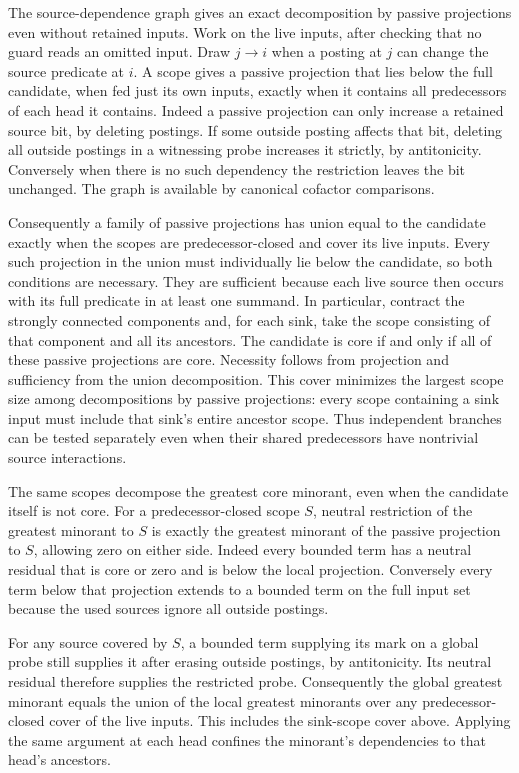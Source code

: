 The source-dependence graph gives an exact decomposition by
passive projections even without retained inputs. Work on the
live inputs, after checking that no guard reads an omitted
input. Draw $j\to i$ when a posting at $j$ can change the
source predicate at $i$. A scope gives a passive projection
that lies below the full candidate, when fed just its own
inputs, exactly when it contains all predecessors of each
head it contains. Indeed a passive projection can only
increase a retained source bit, by deleting postings. If some
outside posting affects that bit, deleting all outside postings
in a witnessing probe increases it strictly, by antitonicity.
Conversely when there is no such dependency the restriction
leaves the bit unchanged. The graph is available by canonical
cofactor comparisons.

Consequently a family of passive projections has union equal
to the candidate exactly when the scopes are predecessor-closed
and cover its live inputs. Every such projection in the union
must individually lie below the candidate, so both conditions
are necessary. They are sufficient because each live source
then occurs with its full predicate in at least one summand.
In particular, contract the strongly connected components and,
for each sink, take the scope consisting of that component and
all its ancestors. The candidate is core if and only if all of
these passive projections are core. Necessity follows from
projection and sufficiency from the union decomposition.
This cover minimizes the largest scope size among decompositions
by passive projections: every scope containing a sink input
must include that sink's entire ancestor scope. Thus independent
branches can be tested separately even when their shared
predecessors have nontrivial source interactions.

The same scopes decompose the greatest core minorant,
even when the candidate itself is not core. For a
predecessor-closed scope $S$, neutral restriction of
the greatest minorant to $S$ is exactly the greatest
minorant of the passive projection to $S$, allowing
zero on either side. Indeed every bounded term has
a neutral residual that is core or zero and is below
the local projection. Conversely every term below
that projection extends to a bounded term on the
full input set because the used sources ignore all
outside postings.

For any source covered by $S$, a bounded term supplying
its mark on a global probe still supplies it after
erasing outside postings, by antitonicity. Its neutral
residual therefore supplies the restricted probe.
Consequently the global greatest minorant equals
the union of the local greatest minorants over
any predecessor-closed cover of the live inputs.
This includes the sink-scope cover above. Applying
the same argument at each head confines the
minorant's dependencies to that head's ancestors.

